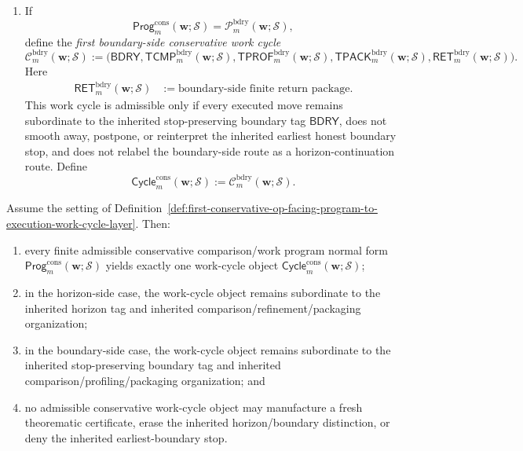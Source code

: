 \begin{definition}
\begin{enumerate}[label=(\roman*)]
 \item If
 \[
 \mathsf{Prog}^{\mathrm{cons}}_{m}(\mathbf w;\mathcal S)
 =
 \mathcal P^{\mathrm{bdry}}_{m}(\mathbf w;\mathcal S),
 \]
define the \emph{first boundary-side conservative work cycle}
{\scriptsize
\[
 \mathcal C^{\mathrm{bdry}}_{m}(\mathbf w;\mathcal S)
 :=
 \bigl(
 \mathsf{BDRY},
 \mathsf{TCMP}^{\mathrm{bdry}}_{m}(\mathbf w;\mathcal S),
 \mathsf{TPROF}^{\mathrm{bdry}}_{m}(\mathbf w;\mathcal S),
 \mathsf{TPACK}^{\mathrm{bdry}}_{m}(\mathbf w;\mathcal S),
 \mathsf{RET}^{\mathrm{bdry}}_{m}(\mathbf w;\mathcal S)
 \bigr).
\]
}
Here
\begin{align*}
 \mathsf{RET}^{\mathrm{bdry}}_{m}(\mathbf w;\mathcal S)
 &:= \text{boundary-side finite return package}.
\end{align*}
This work cycle is admissible only if every executed move remains subordinate to the inherited stop-preserving boundary tag \(\mathsf{BDRY}\), does not smooth away, postpone, or reinterpret the inherited earliest honest boundary stop, and does not relabel the boundary-side route as a horizon-continuation route. Define
{\small
\[
 \mathsf{Cycle}^{\mathrm{cons}}_{m}(\mathbf w;\mathcal S)
 :=
 \mathcal C^{\mathrm{bdry}}_{m}(\mathbf w;\mathcal S).
\]
}
\end{enumerate}
\end{definition}

\begin{proposition}
\label{prop:every-finite-admissible-conservative-comparison-work-program-normal-form-yields-exactly-one-conservative-work-cycle-object}
Assume the setting of Definition~\ref{def:first-conservative-op-facing-program-to-execution-work-cycle-layer}. Then:
\begin{enumerate}[label=(\roman*)]
 \item every finite admissible conservative comparison/work program normal form \(\mathsf{Prog}^{\mathrm{cons}}_{m}(\mathbf w;\mathcal S)\) yields exactly one work-cycle object \(\mathsf{Cycle}^{\mathrm{cons}}_{m}(\mathbf w;\mathcal S)\);
 \item in the horizon-side case, the work-cycle object remains subordinate to the inherited horizon tag and inherited comparison/refinement/packaging organization;
 \item in the boundary-side case, the work-cycle object remains subordinate to the inherited stop-preserving boundary tag and inherited comparison/profiling/packaging organization; and
 \item no admissible conservative work-cycle object may manufacture a fresh theorematic certificate, erase the inherited horizon/boundary distinction, or deny the inherited earliest-boundary stop.
\end{enumerate}
\end{proposition}


